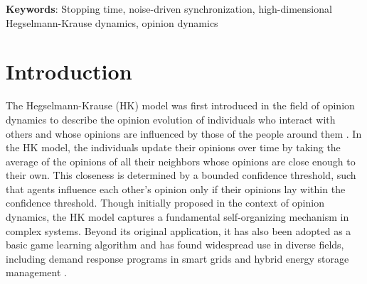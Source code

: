 \documentclass[11pt]{article}
\theoremstyle{definition}
\theoremstyle{remark}
\numberwithin{equation}{section}
\begin{document}
%
\date{}%
\maketitle
\begin{abstract}
The behavior of one-dimensional Hegselmann-Krause (HK) dynamics driven by noise has been extensively studied. Previous research has indicated that within no matter the bounded or the unbounded space of one dimension, the HK dynamics attain quasi-synchronization (synchronization in noisy case) in finite time. However, it remains unclear whether this phenomenon holds in high-dimensional space. This paper investigates the random time for quasi-synchronization of multi-dimensional HK model and reveals that the boundedness and dimensions of the space determine different outcomes. To be specific, if the space is bounded, quasi-synchronization can be attained almost surely for all dimensions within a finite time, whereas in unbounded space, quasi-synchronization can only be achieved in low-dimensional cases (one and two). Furthermore, different integrability of the random time of various cases is proved.
\end{abstract}

\textbf{Keywords}: Stopping time, noise-driven synchronization, high-dimensional Hegselmann-Krause dynamics, opinion dynamics
\section{Introduction}\label{Section:introduction}
The Hegselmann-Krause (HK) model was first introduced in the field of opinion dynamics to describe the opinion evolution of individuals who interact with others and whose opinions are influenced by those of the people around them \cite{Hegselmann2002}. In the HK model, the individuals update their opinions over time by taking the average of the opinions of all their neighbors whose opinions are close enough to their own. This closeness is determined by a bounded confidence threshold, such that agents influence each other's opinion only if their opinions lay within the confidence threshold. Though initially proposed in the context of opinion dynamics, the HK model captures a fundamental self-organizing mechanism in complex systems. Beyond its original application, it has also been adopted as a basic game learning algorithm \cite{Acemoglu2011, Basar2015} and has found widespread use in diverse fields, including demand response programs in smart grids \cite{Nava2015} and hybrid energy storage management \cite{Abdelghany2024}.
\end{document}
